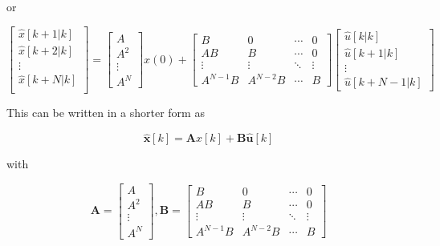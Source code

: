 \noindent
or

\noindent
\begin{equation}
	\left[
		\begin{matrix}
			\hat{x}[k+1|k] \\
			\hat{x}[k+2|k] \\
			\vdots \\
			\hat{x}[k+N|k] \\
		\end{matrix}
	\right] = 
	\left[
		\begin{matrix}
			A \\
			A^2 \\
			\vdots \\
			A^N
		\end{matrix}
	\right]
	x(0) + 
	\left[
		\begin{matrix}
			B & 0 & \cdots & 0 \\
			AB & B & \cdots & 0 \\
			\vdots & \vdots & \ddots & \vdots \\
			A^{N-1}B & A^{N-2}B & \cdots & B
		\end{matrix}
	\right]
	\left[
		\begin{matrix}
			\hat{u}[k|k] \\
			\hat{u}[k+1|k]\\
			\vdots \\
			\hat{u}[k+N-1|k]
		\end{matrix}
	\right]
\end{equation}

This can be written in a shorter form as



\noindent
\begin{equation}
	\label{cap3_eq_predicao_xk}
	\mathbf{\hat{x}}[k] = \mathbf{A}x[k] + \mathbf{B \hat{u}}[k]
\end{equation}

\noindent
with 

\noindent
\begin{equation}
	\mathbf{A} = \left[
		\begin{matrix}
			A \\
			A^2 \\
			\vdots \\
			A^N
		\end{matrix}
	\right]
	, 
	\mathbf{B} = \left[
		\begin{matrix}
			B  & 0 & \cdots & 0 \\
			AB & B & \cdots & 0 \\
			\vdots  & \vdots & \ddots & \vdots \\
			A^{N-1}B & A^{N-2}B & \cdots & B
		\end{matrix}
	\right]
\end{equation}

